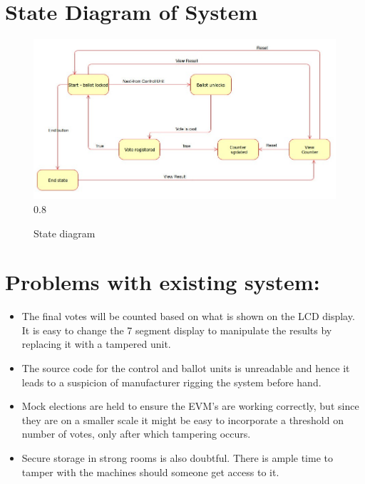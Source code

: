 \documentclass[a4paper,11pt]{article}
\begin{document}
\section{State Diagram of System}

\begin{figure}[h!]
  \centering
  \begin{annotate}{\includegraphics[width=1\textwidth]{state.jpg}}{0.8}
  \end{annotate}
  \caption{State diagram\protect\footnotemark}\label{fig:Airbus}
\end{figure}

\section{Problems with existing system:}
\begin{itemize}
    \item The final votes will be counted based on what is shown on the LCD display. It is easy to change the 7 segment display to manipulate the results by replacing it with a tampered unit. 
    
    \item The source code for the control and ballot units is unreadable and hence it leads to a suspicion of manufacturer rigging the system before hand.
    
    \item Mock elections are held to ensure the EVM's are working correctly, but since they are on a smaller scale it might be easy to incorporate a threshold on number of votes, only after which tampering occurs.
    
    \item Secure storage in strong rooms is also doubtful. There is ample time to tamper with the machines should someone get access to it.  
\end{itemize}
\end{document}
